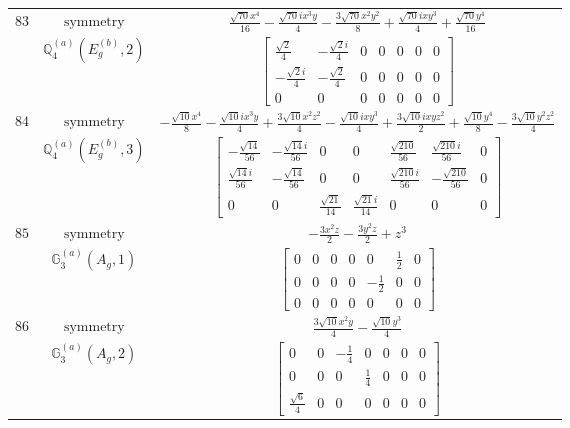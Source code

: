 \documentclass[fleqn,8pt,landscape]{jsarticle}
\begin{document}
\begin{longtable}{ccc}
$ 83 $ & $ \text{symmetry} $ & $ \frac{\sqrt{70} x^{4}}{16} - \frac{\sqrt{70} i x^{3} y}{4} - \frac{3 \sqrt{70} x^{2} y^{2}}{8} + \frac{\sqrt{70} i x y^{3}}{4} + \frac{\sqrt{70} y^{4}}{16} $ \\
$  $ & $ \mathbb{Q}_{4}^{(a)}(E_{g}^{(b)},2) $ & $ \begin{bmatrix} \frac{\sqrt{2}}{4} & - \frac{\sqrt{2} i}{4} & 0 & 0 & 0 & 0 & 0 \\ - \frac{\sqrt{2} i}{4} & - \frac{\sqrt{2}}{4} & 0 & 0 & 0 & 0 & 0 \\ 0 & 0 & 0 & 0 & 0 & 0 & 0 \end{bmatrix} $ \\ \hline
$ 84 $ & $ \text{symmetry} $ & $ - \frac{\sqrt{10} x^{4}}{8} - \frac{\sqrt{10} i x^{3} y}{4} + \frac{3 \sqrt{10} x^{2} z^{2}}{4} - \frac{\sqrt{10} i x y^{3}}{4} + \frac{3 \sqrt{10} i x y z^{2}}{2} + \frac{\sqrt{10} y^{4}}{8} - \frac{3 \sqrt{10} y^{2} z^{2}}{4} $ \\
$  $ & $ \mathbb{Q}_{4}^{(a)}(E_{g}^{(b)},3) $ & $ \begin{bmatrix} - \frac{\sqrt{14}}{56} & - \frac{\sqrt{14} i}{56} & 0 & 0 & \frac{\sqrt{210}}{56} & \frac{\sqrt{210} i}{56} & 0 \\ \frac{\sqrt{14} i}{56} & - \frac{\sqrt{14}}{56} & 0 & 0 & \frac{\sqrt{210} i}{56} & - \frac{\sqrt{210}}{56} & 0 \\ 0 & 0 & \frac{\sqrt{21}}{14} & \frac{\sqrt{21} i}{14} & 0 & 0 & 0 \end{bmatrix} $ \\ \hline
$ 85 $ & $ \text{symmetry} $ & $ - \frac{3 x^{2} z}{2} - \frac{3 y^{2} z}{2} + z^{3} $ \\
$  $ & $ \mathbb{G}_{3}^{(a)}(A_{g},1) $ & $ \begin{bmatrix} 0 & 0 & 0 & 0 & 0 & \frac{1}{2} & 0 \\ 0 & 0 & 0 & 0 & - \frac{1}{2} & 0 & 0 \\ 0 & 0 & 0 & 0 & 0 & 0 & 0 \end{bmatrix} $ \\ \hline
$ 86 $ & $ \text{symmetry} $ & $ \frac{3 \sqrt{10} x^{2} y}{4} - \frac{\sqrt{10} y^{3}}{4} $ \\
$  $ & $ \mathbb{G}_{3}^{(a)}(A_{g},2) $ & $ \begin{bmatrix} 0 & 0 & - \frac{1}{4} & 0 & 0 & 0 & 0 \\ 0 & 0 & 0 & \frac{1}{4} & 0 & 0 & 0 \\ \frac{\sqrt{6}}{4} & 0 & 0 & 0 & 0 & 0 & 0 \end{bmatrix} $ \\ \hline

\end{longtable}
\end{document}
